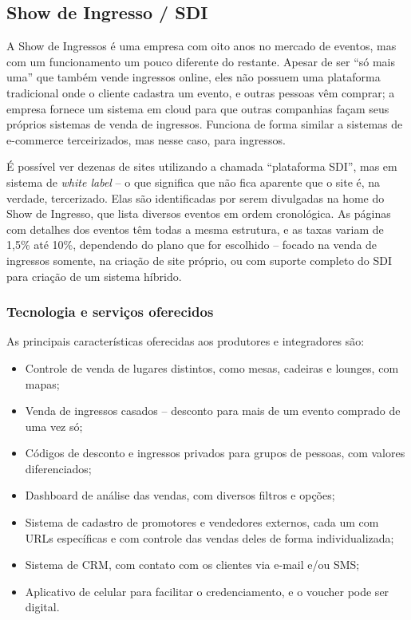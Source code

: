 \documentclass[12pt,a4paper,twoside,hyphens,english,brazil]{abntex2}
\begin{document}
\subsection{Show de Ingresso / SDI} \label{sec:concorrencia:sdi}
\label{sec:show-de-ingresso}
A Show de Ingressos é uma empresa com oito anos no mercado de eventos, mas com um funcionamento um pouco diferente do restante. Apesar de ser ``só mais uma'' que também vende ingressos online, eles não possuem uma plataforma tradicional onde o cliente cadastra um evento, e outras pessoas vêm comprar; a empresa fornece um sistema em cloud para que outras companhias façam seus próprios sistemas de venda de ingressos. Funciona de forma similar a sistemas de e-commerce terceirizados, mas nesse caso, para ingressos.

É possível ver dezenas de sites utilizando a chamada ``plataforma SDI'', mas em sistema de \emph{white label} -- o que significa que não fica aparente que o site é, na verdade, tercerizado. Elas são identificadas por serem divulgadas na home do Show de Ingresso, que lista diversos eventos em ordem cronológica. As páginas com detalhes dos eventos têm todas a mesma estrutura, e as taxas variam de 1,5\% até 10\%, dependendo do plano que for escolhido -- focado na venda de ingressos somente, na criação de site próprio, ou com suporte completo do SDI para criação de um sistema híbrido.

\subsubsection*{Tecnologia e serviços oferecidos}
As principais características oferecidas aos produtores e integradores são:
\begin{itemize}[itemsep=-1ex]
	\item Controle de venda de lugares distintos, como mesas, cadeiras e lounges, com mapas;
	\item Venda de ingressos casados -- desconto para mais de um evento comprado de uma vez só;
	\item Códigos de desconto e ingressos privados para grupos de pessoas, com valores diferenciados;
	\item Dashboard de análise das vendas, com diversos filtros e opções;
	\item Sistema de cadastro de promotores e vendedores externos, cada um com URLs específicas e com controle das vendas deles de forma individualizada;
	\item Sistema de CRM, com contato com os clientes via e-mail e/ou SMS;
	\item Aplicativo de celular para facilitar o credenciamento, e o voucher pode ser digital.
\end{itemize}
\end{document}
